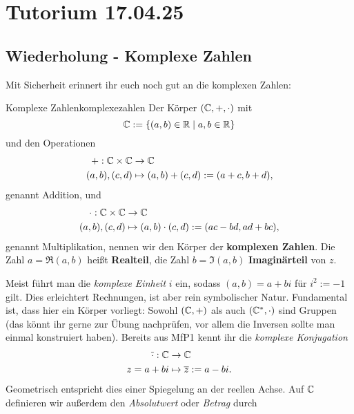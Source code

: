 \section{Tutorium 17.04.25}
\label{sec:17_04_25}

\subsection{Wiederholung - Komplexe Zahlen}
Mit Sicherheit erinnert ihr euch noch gut an die komplexen Zahlen:
\begin{definition}{Komplexe Zahlen}{komplexezahlen}
Der Körper $(\mathbb{C}, +, \cdot)$ mit
\begin{equation}
\mathbb{C} := \{(a,b) \in \mathbb{R} \mid a,b \in \mathbb{R}\}
\end{equation}
und den Operationen
\begin{equation}
\begin{split}
+: \mathbb{C} \times \mathbb{C} &\to \mathbb{C}\\
(a,b), (c,d) &\mapsto (a,b) + (c,d) := (a+c,b+d),
\end{split}
\end{equation}
genannt Addition, und
\begin{equation}
\begin{split}
\cdot: \mathbb{C} \times \mathbb{C} &\to \mathbb{C}\\
(a,b),(c,d) &\mapsto (a,b) \cdot (c,d) := (ac-bd, ad+bc),
\end{split}
\end{equation}
genannt Multiplikation, nennen wir den Körper der \textbf{komplexen Zahlen}. Die Zahl $a=\Re(a,b)$ heißt \textbf{Realteil}, die Zahl $b=\Im(a,b)$ \textbf{Imaginärteil} von $z$. 
\end{definition}
Meist führt man die \textit{komplexe Einheit} $i$ ein, sodass $(a,b)=a+bi$ für $i^2:=-1$ gilt. Dies erleichtert Rechnungen, ist aber rein symbolischer Natur. Fundamental ist, dass hier ein Körper vorliegt: Sowohl $(\mathbb{C}, +)$ als auch $(\mathbb{C}^\ast, \cdot)$ sind Gruppen (das könnt ihr gerne zur Übung nachprüfen, vor allem die Inversen sollte man einmal konstruiert haben). Bereits aus MfP1 kennt ihr die \textit{komplexe Konjugation}
\begin{equation}
\begin{split}
\overline{\cdot}: \mathbb{C} &\to \mathbb{C}\\
z = a+bi &\mapsto \overline{z} := a-bi.
\end{split}
\end{equation}
Geometrisch entspricht dies einer Spiegelung an der reellen Achse. Auf $\mathbb{C}$ definieren wir außerdem den \textit{Absolutwert} oder \textit{Betrag} durch
